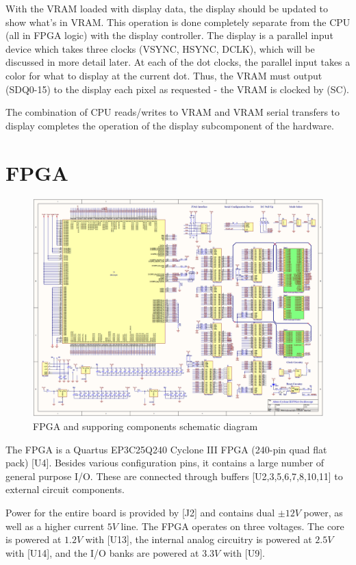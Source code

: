 With the VRAM loaded with display data, the display should be updated to show what's in VRAM. This operation is done completely separate from the CPU (all in FPGA logic) with the display controller. The display is a parallel input device which takes three clocks (VSYNC, HSYNC, DCLK), which will be discussed in more detail later. At each of the dot clocks, the parallel input takes a color for what to display at the current dot. Thus, the VRAM must output (SDQ0-15) to the display each pixel as requested - the VRAM is clocked by (SC).

The combination of CPU reads/writes to VRAM and VRAM serial transfers to display completes the operation of the display subcomponent of the hardware.

\section{FPGA}

\begin{figure}[ht!]
    \centering
    \includegraphics[width=6in]{circuit/main_fpga.png}
		\caption{FPGA and supporing components schematic diagram}
\end{figure}

The FPGA is a Quartus EP3C25Q240 Cyclone III FPGA (240-pin quad flat pack) [U4]. Besides various configuration pins, it contains a large number of general purpose I/O. These are connected through buffers [U2,3,5,6,7,8,10,11] to external circuit components.

Power for the entire board is provided by [J2] and contains dual $\pm 12V$ power, as well as a higher current $5V$ line. The FPGA operates on three voltages. The core is powered at $1.2V$ with [U13], the internal analog circuitry is powered at $2.5V$ with [U14], and the I/O banks are powered at $3.3V$ with [U9].

